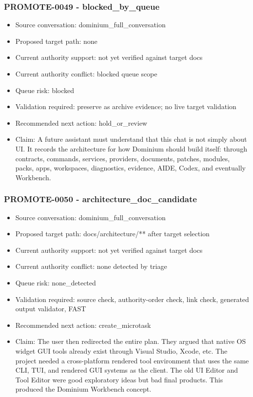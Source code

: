 \documentclass[11pt,a4paper]{report}
\begin{document}
\subsubsection{PROMOTE-0049 - blocked\_by\_queue}

\begin{itemize}
\item Source conversation: dominium\_full\_conversation
\item Proposed target path: none
\item Current authority support: not yet verified against target docs
\item Current authority conflict: blocked queue scope
\item Queue risk: blocked
\item Validation required: preserve as archive evidence; no live target validation
\item Recommended next action: hold\_or\_review
\item Claim: A future assistant must understand that this chat is not simply about UI. It records the architecture for how Dominium should build itself: through contracts, commands, services, providers, documents, patches, modules, packs, apps, workspaces, diagnostics, evidence, AIDE, Codex, and eventually Workbench.
\end{itemize}

\subsubsection{PROMOTE-0050 - architecture\_doc\_candidate}

\begin{itemize}
\item Source conversation: dominium\_full\_conversation
\item Proposed target path: docs/architecture/** after target selection
\item Current authority support: not yet verified against target docs
\item Current authority conflict: none detected by triage
\item Queue risk: none\_detected
\item Validation required: source check, authority-order check, link check, generated output validator, FAST
\item Recommended next action: create\_microtask
\item Claim: The user then redirected the entire plan. They argued that native OS widget GUI tools already exist through Visual Studio, Xcode, etc. The project needed a cross-platform rendered tool environment that uses the same CLI, TUI, and rendered GUI systems as the client. The old UI Editor and Tool Editor were good exploratory ideas but bad final products. This produced the Dominium Workbench concept.
\end{itemize}
\end{document}
